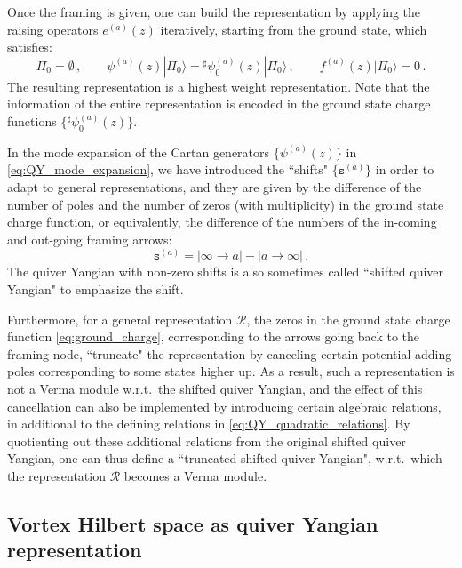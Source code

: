 \documentclass[12pt,a4paper]{article}
\renewcommand{\(}{\left(}
\renewcommand{\)}{\right)}
\renewcommand{\(}{\left(}
\renewcommand{\)}{\right)}
\begin{document}
\medskip


Once the framing is given, one can build the representation by applying the raising operators $e^{(a)}(z)$ iteratively, starting from the ground state, 
which satisfies:
\begin{equation}
	\Pi_0=\emptyset\,,
	\qquad \psi^{(a)}(z) |\Pi_0\rangle= {}^\sharp\psi^{(a)}_0(z) |\Pi_0\rangle\,,
	\qquad f^{(a)}(z) |\Pi_0\rangle=0\,.
\end{equation}
The resulting representation is a highest weight representation. 
Note that the information of the entire representation is encoded in the ground state charge functions $\{{}^\sharp\psi^{(a)}_0(z)\}$.


\medskip

In the mode expansion of the Cartan generators $\{\psi^{(a)}(z)\}$ in \eqref{eq:QY_mode_expansion}, we have introduced the ``shifts" $\{\mathtt{s}^{(a)}\}$ in order to adapt to general representations, and they are given by the difference of the number of poles and the number of zeros (with multiplicity) in the ground state charge function, or equivalently,  the difference of the numbers of the in-coming and out-going framing arrows: 
\begin{equation}\label{eq:QY_shift}
\mathtt{s}^{(a)}=|\infty\to a|-|a\to\infty|\,.
\end{equation}
The quiver Yangian with non-zero shifts is also sometimes called ``shifted quiver Yangian" to emphasize the shift. 

Furthermore, for a general representation $\mathcal{R}$, the zeros in the ground state charge function \eqref{eq:ground_charge}, corresponding to the arrows going back to the framing node,  ``truncate" the representation by canceling certain potential adding poles corresponding to some states higher up. 
As a result, such a representation is not a Verma module w.r.t.\ the shifted quiver Yangian, and the effect of this cancellation can also be implemented by introducing certain algebraic relations, in additional to the defining relations in \eqref{eq:QY_quadratic_relations}.  
By quotienting out these additional relations from the original shifted quiver Yangian,
one can thus define a ``truncated shifted quiver Yangian", w.r.t.\ which the representation $\mathcal{R}$ becomes a Verma module.



\subsection{Vortex Hilbert space as quiver Yangian representation}
\label{ssec:vortex_as_QY_rep}
\end{document}
